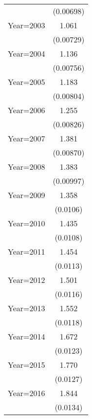 {\begin{longtable}{l*{1}{c}}
                    &   (0.00698)         \\
\addlinespace
Year=2003           &       1.061\sym{***}\\
                    &   (0.00729)         \\
\addlinespace
Year=2004           &       1.136\sym{***}\\
                    &   (0.00756)         \\
\addlinespace
Year=2005           &       1.183\sym{***}\\
                    &   (0.00804)         \\
\addlinespace
Year=2006           &       1.255\sym{***}\\
                    &   (0.00826)         \\
\addlinespace
Year=2007           &       1.381\sym{***}\\
                    &   (0.00870)         \\
\addlinespace
Year=2008           &       1.383\sym{***}\\
                    &   (0.00997)         \\
\addlinespace
Year=2009           &       1.358\sym{***}\\
                    &    (0.0106)         \\
\addlinespace
Year=2010           &       1.435\sym{***}\\
                    &    (0.0108)         \\
\addlinespace
Year=2011           &       1.454\sym{***}\\
                    &    (0.0113)         \\
\addlinespace
Year=2012           &       1.501\sym{***}\\
                    &    (0.0116)         \\
\addlinespace
Year=2013           &       1.552\sym{***}\\
                    &    (0.0118)         \\
\addlinespace
Year=2014           &       1.672\sym{***}\\
                    &    (0.0123)         \\
\addlinespace
Year=2015           &       1.770\sym{***}\\
                    &    (0.0127)         \\
\addlinespace
Year=2016           &       1.844\sym{***}\\
                    &    (0.0134)         \\

\end{longtable}}
